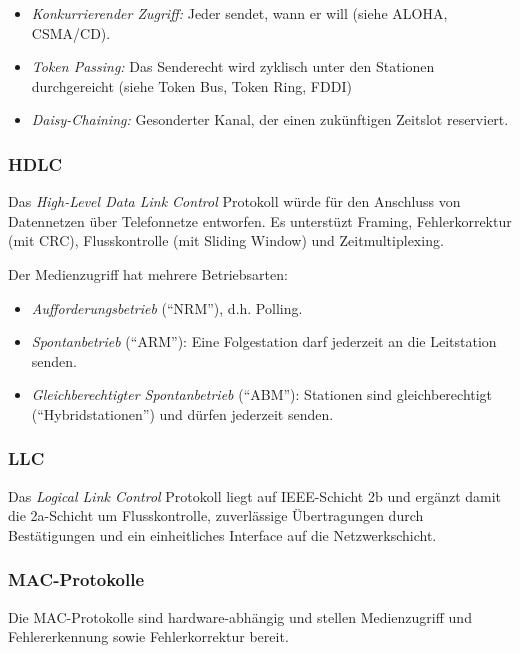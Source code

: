 \documentclass[a4paper,parskip=half*,DIV=15,fontsize=11pt]{scrartcl}
\begin{document}
\begin{itemize}
\item \emph{Konkurrierender Zugriff:} Jeder sendet, wann er will (siehe ALOHA, CSMA/CD).
\item \emph{Token Passing:} Das Senderecht wird zyklisch unter den Stationen durchgereicht (siehe Token Bus, Token Ring, FDDI)
\item \emph{Daisy-Chaining:} Gesonderter Kanal, der einen zukünftigen Zeitslot reserviert.
\end{itemize}

\subsubsection{HDLC}

Das \emph{High-Level Data Link Control} Protokoll würde für den Anschluss von Datennetzen über Telefonnetze entworfen. Es unterstüzt Framing, Fehlerkorrektur (mit CRC), Flusskontrolle (mit Sliding Window) und Zeitmultiplexing.

Der Medienzugriff hat mehrere Betriebsarten:
\begin{itemize}
\item \emph{Aufforderungsbetrieb} (``NRM''), d.h. Polling.
\item \emph{Spontanbetrieb} (``ARM''): Eine Folgestation darf jederzeit an die Leitstation senden.
\item \emph{Gleichberechtigter Spontanbetrieb} (``ABM''): Stationen sind gleichberechtigt (``Hybridstationen'') und dürfen jederzeit senden.
\end{itemize}

\subsubsection{LLC}

Das \emph{Logical Link Control} Protokoll liegt auf IEEE-Schicht 2b und ergänzt damit die 2a-Schicht um Flusskontrolle, zuverlässige Übertragungen durch Bestätigungen und ein einheitliches Interface auf die Netzwerkschicht.

\subsubsection{MAC-Protokolle}

Die MAC-Protokolle sind hardware-abhängig und stellen Medienzugriff und Fehlererkennung sowie Fehlerkorrektur bereit.
\end{document}
